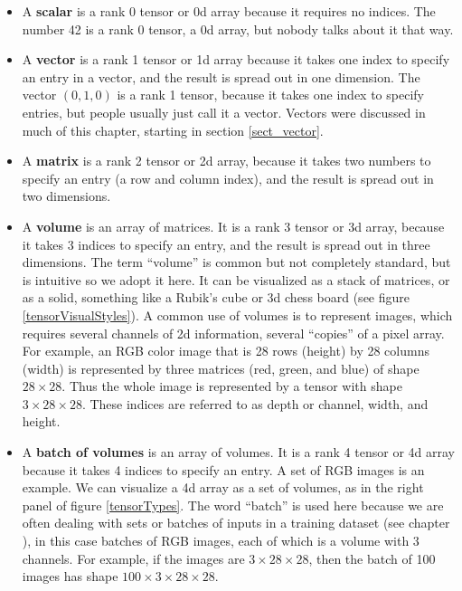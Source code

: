 \begin{itemize}
\item A \textbf{scalar} is a rank 0 tensor or 0d array because it requires no indices. The number 42 is a rank 0 tensor, a 0d array, but nobody talks about it that way. 
\item A \textbf{vector} is a rank 1 tensor or 1d array because it takes one index to specify an entry in a vector, and the result is spread out in one dimension. The vector $(0,1,0)$ is a rank 1 tensor, because it takes one index to specify entries, but people usually just call it a vector. Vectors were discussed in much of this chapter, starting in section \ref{sect_vector}.
\item A \textbf{matrix} is a rank 2 tensor or 2d array, because it takes two numbers to specify an entry (a row and column index), and the result is spread out in two dimensions.
\item A \textbf{volume} is an array of matrices. It is a rank 3 tensor or 3d array, because it takes 3 indices to specify an entry, and the result is spread out in three dimensions. The term ``volume'' is common but not completely standard, but is intuitive so we adopt it here. It can be visualized as a stack of matrices, or as a solid, something like a Rubik's cube or 3d chess board (see figure \ref{tensorVisualStyles}). A common use of volumes is to represent images, which requires several channels of 2d information, several ``copies'' of a pixel array. For example, an RGB color image that is 28 rows (height) by 28 columns (width) is represented by three matrices (red, green, and blue) of shape $28 \times 28$. Thus the whole image is represented by a tensor with shape $3 \times 28 \times 28$. These indices are referred to as depth or channel, width, and height. 
\item A \textbf{batch of volumes} is an array of volumes. It is a rank 4 tensor or 4d array because it takes 4 indices to specify an entry. A set of RGB images is an example. We can visualize a 4d array as a set of volumes, as in the right panel of figure \ref{tensorTypes}. The word ``batch'' is used here because we are often dealing with sets or batches of inputs in a training dataset (see chapter ), in this case batches of RGB images, each of which is a volume with 3 channels. For example, if the images are $3 \times 28 \times 28$, then the batch of 100 images has shape $100 \times 3 \times 28 \times 28$. 
\end{itemize}


